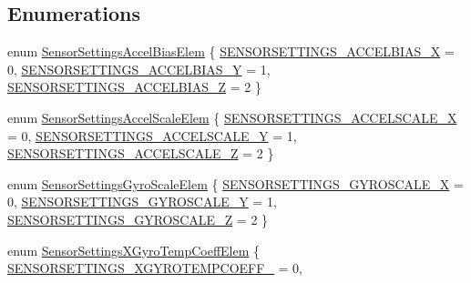 \subsection*{\-Enumerations}
\begin{DoxyCompactItemize}
\item 
enum \hyperlink{group___sensor_settings_gaa63ad43912e8088b6cc8c8321a3a623c}{\-Sensor\-Settings\-Accel\-Bias\-Elem} \{ \hyperlink{group___sensor_settings_ggaa63ad43912e8088b6cc8c8321a3a623cab28eda39c928a7b66ab5b021873f2dbf}{\-S\-E\-N\-S\-O\-R\-S\-E\-T\-T\-I\-N\-G\-S\-\_\-\-A\-C\-C\-E\-L\-B\-I\-A\-S\-\_\-\-X} = 0, 
\hyperlink{group___sensor_settings_ggaa63ad43912e8088b6cc8c8321a3a623caa5f09fe36878e76aec1e66d7f494486e}{\-S\-E\-N\-S\-O\-R\-S\-E\-T\-T\-I\-N\-G\-S\-\_\-\-A\-C\-C\-E\-L\-B\-I\-A\-S\-\_\-\-Y} = 1, 
\hyperlink{group___sensor_settings_ggaa63ad43912e8088b6cc8c8321a3a623cac98e83ca55690af8de082a44bc6e2005}{\-S\-E\-N\-S\-O\-R\-S\-E\-T\-T\-I\-N\-G\-S\-\_\-\-A\-C\-C\-E\-L\-B\-I\-A\-S\-\_\-\-Z} = 2
 \}
\item 
enum \hyperlink{group___sensor_settings_ga3af8e6a182923cfd71a1600fb3f1b677}{\-Sensor\-Settings\-Accel\-Scale\-Elem} \{ \hyperlink{group___sensor_settings_gga3af8e6a182923cfd71a1600fb3f1b677a78e520f3b17cfb2529f461ddf2ad303f}{\-S\-E\-N\-S\-O\-R\-S\-E\-T\-T\-I\-N\-G\-S\-\_\-\-A\-C\-C\-E\-L\-S\-C\-A\-L\-E\-\_\-\-X} = 0, 
\hyperlink{group___sensor_settings_gga3af8e6a182923cfd71a1600fb3f1b677aa78ca73b6a7fef92c8cf8cdd9e6b819b}{\-S\-E\-N\-S\-O\-R\-S\-E\-T\-T\-I\-N\-G\-S\-\_\-\-A\-C\-C\-E\-L\-S\-C\-A\-L\-E\-\_\-\-Y} = 1, 
\hyperlink{group___sensor_settings_gga3af8e6a182923cfd71a1600fb3f1b677adc8aeea6c0b2b683b117df5428f386f4}{\-S\-E\-N\-S\-O\-R\-S\-E\-T\-T\-I\-N\-G\-S\-\_\-\-A\-C\-C\-E\-L\-S\-C\-A\-L\-E\-\_\-\-Z} = 2
 \}
\item 
enum \hyperlink{group___sensor_settings_ga89b59fb1a3e886a57c210d5b205606fd}{\-Sensor\-Settings\-Gyro\-Scale\-Elem} \{ \hyperlink{group___sensor_settings_gga89b59fb1a3e886a57c210d5b205606fda748486b6805f5442a027dab74d9e138b}{\-S\-E\-N\-S\-O\-R\-S\-E\-T\-T\-I\-N\-G\-S\-\_\-\-G\-Y\-R\-O\-S\-C\-A\-L\-E\-\_\-\-X} = 0, 
\hyperlink{group___sensor_settings_gga89b59fb1a3e886a57c210d5b205606fda11dee1399fd3c76dfa106601f76cc267}{\-S\-E\-N\-S\-O\-R\-S\-E\-T\-T\-I\-N\-G\-S\-\_\-\-G\-Y\-R\-O\-S\-C\-A\-L\-E\-\_\-\-Y} = 1, 
\hyperlink{group___sensor_settings_gga89b59fb1a3e886a57c210d5b205606fda8a61c0ad89118b30a0d556011e4e6f9e}{\-S\-E\-N\-S\-O\-R\-S\-E\-T\-T\-I\-N\-G\-S\-\_\-\-G\-Y\-R\-O\-S\-C\-A\-L\-E\-\_\-\-Z} = 2
 \}
\item 
enum \hyperlink{group___sensor_settings_ga4cc942099dc06939b4dc72f833ba4893}{\-Sensor\-Settings\-X\-Gyro\-Temp\-Coeff\-Elem} \{ \hyperlink{group___sensor_settings_gga4cc942099dc06939b4dc72f833ba4893af1157bef563f3b8084c73fa9a43fa613}{\-S\-E\-N\-S\-O\-R\-S\-E\-T\-T\-I\-N\-G\-S\-\_\-\-X\-G\-Y\-R\-O\-T\-E\-M\-P\-C\-O\-E\-F\-F\-\_} = 0, 

\end{DoxyCompactItemize}
